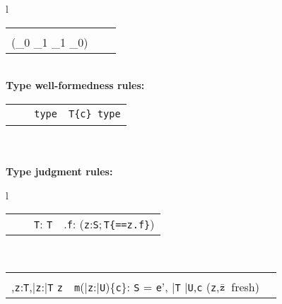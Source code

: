 \begin{figure*}
\begin{tabular}{l}
{\begin{tabular}{p{}p{}p{}}
&
\infrule[Equals]
        {\Gamma \vdash {\tt t}_0: {\tt T}_0
        \andalso
        \Gamma \vdash {\tt t}_1: {\tt T}_1 \\
          (\Gamma \vdash {\tt T}_0 \subtype {\tt T}_1 \vee
          \Gamma \vdash {\tt T}_1 \subtype {\tt T}_0)}
        {\Gamma \vdash {\tt t}_0{\tt ==}{\tt t}_1:o}
\\
\end{tabular}}
\quad\\
{\bf Type well-formedness rules:}\\[-12pt]
{\tabcolsep=0pt
\begin{tabular}{p{}p{}p{}}
\infrule[Class]
	{\Gamma \vdash \klass({\tt C})}
	{\Gamma \vdash {\tt C}\ \type} 
&
\infrule[Exists-T]
	{\Gamma\tt \vdash {\tt S}\ \type, {\tt T}\ \type}
	{\Gamma\tt \vdash {\tt x:S;T}\ {\tt type}} 
&
\infrule[Dep]
	{\Gamma\tt \vdash T\ \type \andalso \Gamma, \self:T \vdash c:o}
	{\Gamma\tt \vdash T\{c\}\ {\tt type}} 
\\
\end{tabular}}
\quad\\
\quad\\
{\bf Type judgment rules:}\\[-12pt]
{\tabcolsep=0pt
\begin{tabular}{l}
\begin{tabular}{p{}p{}p{}}
\infax[T-Var]
      {\Gamma, {\tt x}:{\tt T} \vdash {\tt x}:{\tt T\{\self==x\}}}
&
\infrule[T-Cast]
	{\Gamma \vdash {\tt e}:{\tt U} \andalso \Gamma \vdash {\tt T} \ \type}
	{\Gamma \vdash {\tt e}\ \as\ {\tt T}: {\tt T}} &
\infrule[T-Field]
	{\Gamma \vdash {\tt e}: {\tt S} \andalso \Gamma,{\tt z}:{\tt S}\vdash {\tt z}\ \has\ {\tt f}:{\tt T} \andalso \mbox{({\tt z} fresh)} }
	{\Gamma \vdash {\tt e}.{\tt f}:  ({\tt z}:{\tt S};\,{\tt T\{\self==z.f\}})}
\end{tabular}\\[-12pt]
\begin{tabular}{p{}p{}} 
\infrule[T-Invk]
	{\Gamma \vdash {\tt e}:{\tt T},\bar{\tt e}:\bar{\tt T} \andalso \\
	  \Gamma,{\tt z}:{\tt T},\bar{\tt z}:\bar{\tt T} \vdash
		{\tt z}\ \has\ {\tt m}(\bar{\tt z}:\bar{\tt U})\{{\tt c}\}: {\tt S} = {\tt e}', 
		\bar{\tt T} \subtype \bar{\tt U},{\tt c} 
	  \andalso \mbox{({\tt z},$\bar{\tt z}$ fresh)}}
	{\Gamma \vdash {\tt e}.{\tt m}(\bar{\tt e}):
                ({\tt z}:{\tt T};\,\bar{\tt z}:\bar{\tt T};\,{\tt S})}

\end{tabular}
\end{tabular}}
\end{tabular}
\end{figure*}
